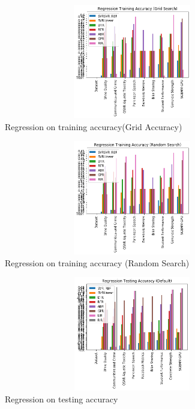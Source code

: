 \documentclass[10pt,twocolumn,letterpaper]{article}
\begin{document}
\begin{figure}
   \begin{center}
   \includegraphics[width=15cm,height=5cm,keepaspectratio]{Regression Training Accuracy (Grid Search).png}
   \end{center}
      \caption{Regression on training accuracy(Grid Accuracy)\label{Regression training accuracy}}
\end{figure}
\begin{figure}
   \begin{center}
   \includegraphics[width=15cm,height=5cm,keepaspectratio]{Regression Training Accuracy (Random Search).png}
   \end{center}
      \caption{Regression on training accuracy (Random Search)\label{Regression training accuracy}}
\end{figure}
\begin{figure}
   \begin{center}
   \includegraphics[width=15cm,height=5cm,keepaspectratio]{Regression Testing Accuracy (Default).png}
   \end{center}
      \caption{Regression on testing accuracy\label{Regression testing accuracy}}
\end{figure}
\end{document}
